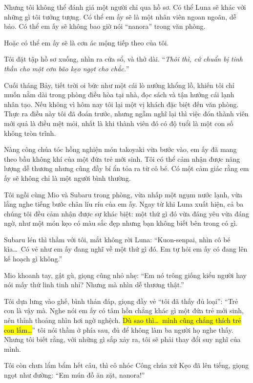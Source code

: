 \documentclass[../main.tex]{subfiles}
\begin{document}
Nhưng tôi không thể đánh giá một người chỉ qua hồ sơ. Có thể Luna sẽ khác với những gì tôi tưởng tượng. Có thể em ấy sẽ là một nhân viên ngoan ngoãn, dễ bảo. Có thể em ấy sẽ không bao giờ nói ``nanora'' trong văn phòng.

Hoặc có thể em ấy sẽ là cơn ác mộng tiếp theo của tôi.

Tôi đặt tập hồ sơ xuống, nhìn ra cửa sổ, và thở dài. ``\textit{Thôi thì, cứ chuẩn bị tinh thần cho một cơn bão kẹo ngọt cho chắc.}''

\il

Cuối tháng Bảy, tiết trời oi bức như một cái lò nướng khổng lồ, khiến tôi chỉ muốn nằm dài trong phòng điều hòa tại nhà, đọc sách và tận hưởng cái lạnh nhân tạo. Nếu không vì hôm nay tôi lại một vị khách đặc biệt đến văn phòng. Thực ra điều này tôi đã đoán trước, nhưng ngẫm nghĩ lại thì việc đón thành viên mới quả là điều mệt mỏi, nhất là khi thành viên đó có độ tuổi là một con số không tròn trĩnh.

Nàng công chúa tóc hồng nghiện món takoyaki vừa bước vào, em ấy đã mang theo bầu không khí của một đứa trẻ mới sinh. Tôi có thể cảm nhận được năng lượng dễ thương nhưng cũng đầy bí ẩn tỏa ra từ cô bé. Có một cảm giác rằng em ấy sẽ không chỉ là một người bình thường.

Tôi ngồi cùng Mio và Subaru trong phòng, vừa nhấp một ngụm nước lạnh, vừa lắng nghe tiếng bước chân líu ríu của em ấy. Ngay từ khi Luna xuất hiện, cả ba chúng tôi đều cảm nhận được sự khác biệt: một thứ gì đó vừa đáng yêu vừa đáng ngờ, như một món kẹo có màu sắc đẹp nhưng bạn không biết bên trong có gì.

Subaru lén thì thầm với tôi, mắt không rời Luna: ``Kuon-senpai, nhìn cô bé kìa\dots\ Có vẻ như em ấy đang nghĩ về một thứ gì đó. Em tự hỏi em ấy có đang lên kế hoạch gì không.''

Mio khoanh tay, gật gù, giọng cũng nhỏ nhẹ: ``Em nó trông giống kiểu người hay nói mấy thứ linh tinh nhỉ? Nhưng mà nhìn dễ thương thật.''

Tôi dựa lưng vào ghế, bình thản đáp, giọng đầy vẻ ``tôi đã thấy đủ loại'': ``Trẻ con là vậy mà. Nghe nói em ấy có tâm hồn chẳng khác gì một đứa trẻ mới sinh, nên thỉnh thoảng nhìn hơi ngờ nghệch. \hl{Dù sao thì\dots\ mình cũng chẳng thích trẻ con lắm\dots}'' tôi nói thầm ở phía sau, đủ để không làm ba người họ nghe thấy. Nhưng tôi biết rằng, với những gì sắp xảy ra, tôi sẽ phải thay đổi suy nghĩ của mình.

Tôi còn chưa lẩm bẩm hết câu, thì cô nhóc Công chúa xứ Kẹo đã lên tiếng, giọng ngọt như đường: ``Em mún đồ ăn zặt, nanora!''
\end{document}

